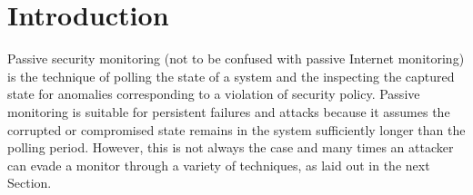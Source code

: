 \section{Introduction}
Passive security monitoring (not to be confused with passive Internet
monitoring) is the technique of polling the state of a system and the inspecting
the captured state for anomalies corresponding to a violation of security
policy. Passive monitoring is suitable for persistent failures and attacks
because it assumes the corrupted or compromised state remains in the system
sufficiently longer than the polling period.  However, this is not always the
case and many times an attacker can evade a monitor through a variety of
techniques, as laid out in the next Section.
